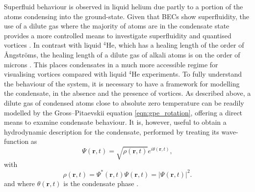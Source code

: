Superfluid behaviour is observed in liquid helium due partly to a portion of the atoms condensing into the ground-state. Given that BECs show superfluidity, the use of a dilute gas where the majority of atoms are in the condensate state provides a more controlled means to investigate superfluidity and quantised vortices \cite{BK:Ueda_2010,BEC:Srinivasen_pramana_2006,Vtx:Tsubota_arxiv_2010,CT:Tsubota_jpsj_2008}. In contrast with liquid $^4$He, which has a healing length of the order of {\r{A}}ngstr{\"o}ms, the healing length of a dilute gas of alkali atoms is on the order of microns \cite{Vtx:Isoshima_pra_1999}. This places condensates in a much more accessible regime for visualising vortices compared with liquid $^4$He experiments. To fully understand the behaviour of the system, it is necessary to have a framework for modelling the condensate, in the absence and the presence of vortices. As described above, a dilute gas of condensed atoms close to absolute zero temperature can be readily modelled by the Gross--Pitaevskii equation \eqref{eqn:gpe_rotation}, offering a direct means to examine condensate behaviour. It is, however, useful to obtain a hydrodynamic description for the condensate, performed by treating its wave-function as
\begin{equation}\label{eqn:madelung}
\Psi(\textbf{r},t) = \sqrt{\rho(\mathbf{r},t)} e^{i\theta(\textbf{r},t)},
\end{equation}
with
\begin{equation}\label{eqn:density}
\rho(\textbf{r},t) = \Psi^*(\textbf{r},t)\Psi(\textbf{r},t) = \vert \Psi (\textbf{r},t) \vert ^2.
\end{equation}
and where $\theta(\textbf{r},t)$ is the condensate phase \cite[~chap. 1]{BK:Pitaevskii_Stringari_2003}.

